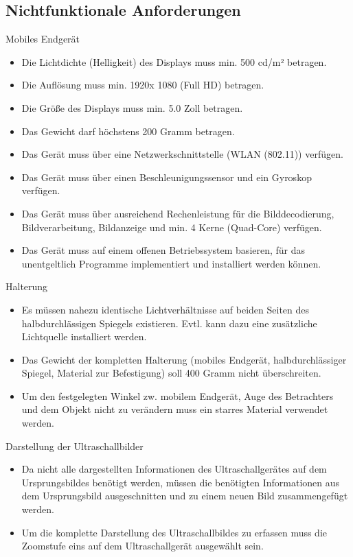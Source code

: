 \subsection{Nichtfunktionale Anforderungen}
\begin{minipage}{\textwidth}
Mobiles Endgerät
\begin{itemize}
\item Die Lichtdichte (Helligkeit) des Displays muss min. 500 cd/m² betragen.
\item Die Auflösung muss min. 1920x 1080 (Full HD) betragen.
\item Die Größe des Displays muss min. 5.0 Zoll betragen.
\item Das Gewicht darf höchstens 200 Gramm betragen.
\item Das Gerät muss über eine Netzwerkschnittstelle (WLAN (802.11)) verfügen.
\item Das Gerät muss über einen Beschleunigungssensor und ein Gyroskop verfügen.
\item Das Gerät muss über ausreichend Rechenleistung für die Bilddecodierung, Bildverarbeitung, Bildanzeige und min. 4 Kerne (Quad-Core) verfügen.
\item Das Gerät muss auf einem offenen Betriebssystem basieren, für das unentgeltlich Programme implementiert und installiert werden können.
\end{itemize}
\end{minipage}

\begin{minipage}{\textwidth}
Halterung
\begin{itemize}
\item Es müssen nahezu identische Lichtverhältnisse auf beiden Seiten des halbdurchlässigen Spiegels existieren. Evtl. kann dazu eine zusätzliche Lichtquelle installiert werden.
\item Das Gewicht der kompletten Halterung (mobiles Endgerät, halbdurchlässiger Spiegel, Material zur Befestigung)  soll 400 Gramm nicht überschreiten.
\item Um den festgelegten Winkel zw. mobilem Endgerät, Auge des Betrachters und dem Objekt nicht zu verändern muss ein starres Material verwendet werden.
\end{itemize}
\end{minipage}

\begin{minipage}{\textwidth}
Darstellung der Ultraschallbilder
\begin{itemize}
\item Da nicht alle dargestellten Informationen des Ultraschallgerätes auf dem Ursprungsbildes benötigt werden, müssen die benötigten Informationen aus dem Ursprungsbild ausgeschnitten und zu einem neuen Bild zusammengefügt werden.
\item Um die komplette Darstellung des Ultraschallbildes zu erfassen muss die Zoomstufe eins auf dem Ultraschallgerät ausgewählt sein.
\end{itemize}
\end{minipage}
